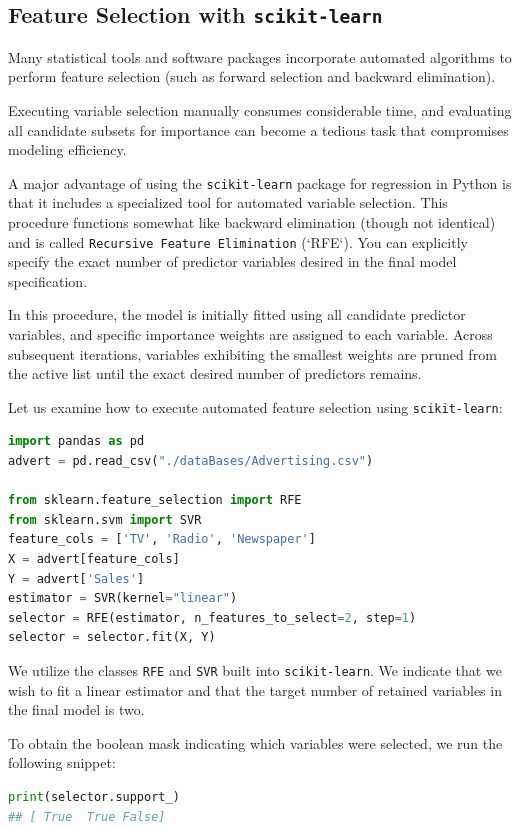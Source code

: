 \subsection{Feature Selection with \texttt{scikit-learn}}

Many statistical tools and software packages incorporate automated algorithms to perform feature selection (such as forward selection and backward elimination).

Executing variable selection manually consumes considerable time, and evaluating all candidate subsets for importance can become a tedious task that compromises modeling efficiency.

A major advantage of using the \texttt{scikit-learn} package for regression in Python is that it includes a specialized tool for automated variable selection. This procedure functions somewhat like backward elimination (though not identical) and is called \texttt{Recursive Feature Elimination} (`RFE`). You can explicitly specify the exact number of predictor variables desired in the final model specification.

In this procedure, the model is initially fitted using all candidate predictor variables, and specific importance weights are assigned to each variable. Across subsequent iterations, variables exhibiting the smallest weights are pruned from the active list until the exact desired number of predictors remains.

Let us examine how to execute automated feature selection using \texttt{scikit-learn}:

\begin{lstlisting}[language=Python]
import pandas as pd
advert = pd.read_csv("./dataBases/Advertising.csv")

from sklearn.feature_selection import RFE
from sklearn.svm import SVR
feature_cols = ['TV', 'Radio', 'Newspaper']
X = advert[feature_cols]
Y = advert['Sales']
estimator = SVR(kernel="linear")
selector = RFE(estimator, n_features_to_select=2, step=1)
selector = selector.fit(X, Y)
\end{lstlisting}

We utilize the classes \texttt{RFE} and \texttt{SVR} built into \texttt{scikit-learn}. We indicate that we wish to fit a linear estimator and that the target number of retained variables in the final model is two.

To obtain the boolean mask indicating which variables were selected, we run the following snippet:
\begin{lstlisting}[language=Python]
print(selector.support_)
## [ True  True False]
\end{lstlisting}

